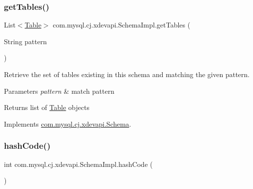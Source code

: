 \subsubsection{\texorpdfstring{get\+Tables()}{getTables()}\hspace{0.1cm}{\footnotesize\ttfamily [2/2]}}
{\footnotesize\ttfamily List$<$\mbox{\hyperlink{interfacecom_1_1mysql_1_1cj_1_1xdevapi_1_1_table}{Table}}$>$ com.\+mysql.\+cj.\+xdevapi.\+Schema\+Impl.\+get\+Tables (\begin{DoxyParamCaption}\item[{String}]{pattern }\end{DoxyParamCaption})}

Retrieve the set of tables existing in this schema and matching the given pattern.


\begin{DoxyParams}{Parameters}
{\em pattern} & match pattern \\
\hline
\end{DoxyParams}
\begin{DoxyReturn}{Returns}
list of \mbox{\hyperlink{interfacecom_1_1mysql_1_1cj_1_1xdevapi_1_1_table}{Table}} objects 
\end{DoxyReturn}


Implements \mbox{\hyperlink{interfacecom_1_1mysql_1_1cj_1_1xdevapi_1_1_schema_a8d508f1db090e9724dd20ed9375a9b53}{com.\+mysql.\+cj.\+xdevapi.\+Schema}}.

\mbox{\label{classcom_1_1mysql_1_1cj_1_1xdevapi_1_1_schema_impl_ac5823bc78000f3e7241045caf9122578}} 
\subsubsection{\texorpdfstring{hash\+Code()}{hashCode()}}
{\footnotesize\ttfamily int com.\+mysql.\+cj.\+xdevapi.\+Schema\+Impl.\+hash\+Code (\begin{DoxyParamCaption}{ }\end{DoxyParamCaption})}

\mbox{\label{classcom_1_1mysql_1_1cj_1_1xdevapi_1_1_schema_impl_a75d95d9f6bc42e795afc262f4acb7664}} 

